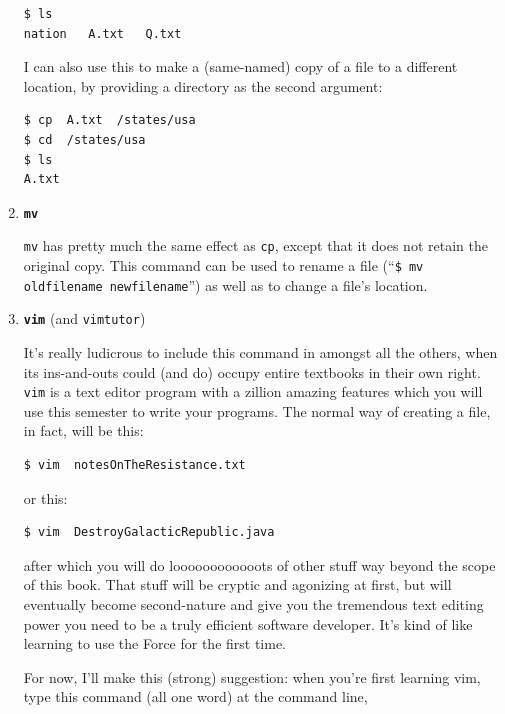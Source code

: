 \begin{enumerate}
\begin{Verbatim}[fontsize=\small]
$ ls
nation   A.txt   Q.txt
\end{Verbatim}

I can also use this to make a (same-named) copy of a file to a different
location, by providing a directory as the second argument:

\begin{Verbatim}[fontsize=\small]
$ cp  A.txt  /states/usa
$ cd  /states/usa
$ ls
A.txt
\end{Verbatim}

\bigline

\item \textbf{\texttt{mv}}

\texttt{mv} has pretty much the same effect as \texttt{cp}, except that it
does not retain the original copy. This command can be used to rename a file
(``\texttt{\$ mv oldfilename newfilename}'') as well as to change a file's
location.

\bigline

\item \textbf{\texttt{vim}} (and \texttt{vimtutor})

It's really ludicrous to include this command in amongst all the others, when
its ins-and-outs could (and do) occupy entire textbooks in their own right.
\texttt{vim} is a text editor program with a zillion amazing features which
you will use this semester to write your programs. The normal way of creating
a file, in fact, will be this:

\begin{Verbatim}[fontsize=\small]
$ vim  notesOnTheResistance.txt
\end{Verbatim}

or this:

\begin{Verbatim}[fontsize=\small]
$ vim  DestroyGalacticRepublic.java
\end{Verbatim}

after which you will do loooooooooooots of other stuff way beyond the scope of
this book. That stuff will be cryptic and agonizing at first, but will
eventually become second-nature and give you the tremendous text editing power
you need to be a truly efficient software developer. It's kind of like
learning to use the Force for the first time.

For now, I'll make this (strong) suggestion: when you're first learning vim,
type this command (all one word) at the command line,


\end{enumerate}
